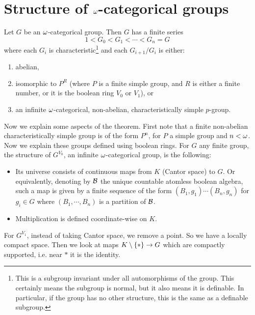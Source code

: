 \documentclass{amsart}
\begin{document}
\section{Structure of $\omega$-categorical groups}

\begin{thm}
Let $G$ be an $\omega$-categorical group. Then $G$ has a finite series 
\begin{equation}
1 < G_0 < G_1 < \cdots < G_n = G
\end{equation}
where each $G_i$ is characteristic\footnote{This is a subgroup invariant under all
automorphisms of the group. This certainly means the subgroup is normal, but it also means
it is definable. 
In particular, if the group has no other structure, this is the same as a definable subgroup.}
and each $G_{i+1} / G_i$ is either:
\begin{enumerate}[label = (\iii)]
\item abelian,
\item isomorphic to $P^R$ (where $P$ is a finite simple group, and $R$ is either a finite
number, or it is the boolean ring $V_0$ or $V_1$), or
\item an infinite $\omega$-categorical, non-abelian, characteristically simple $p$-group.
\end{enumerate}
\end{thm}

Now we explain some aspects of the theorem.
First note that a finite non-abelian characteristically simple group is of the form $P^n$,
for $P$ a simple group and $n < \omega$.
Now we explain these groups defined using boolean rings.
For $G$ any finite group, the structure of $G^{V_0}$, an infinite $\omega$-categorical group, is the following:
\begin{itemize}
\item Its universe consists of continuous maps from $K$ (Cantor space) to $G$.
Or equivalently, denoting by $\mathcal{B}$ the unique countable atomless boolean algebra, such a
map is given by a finite sequence of the form $\left( B_1 , g_1 \right) \cdots \left( B_n,
g_n\right)$ for $g_i\in G$ where $\left( B_1 , \cdots , B_n \right)$ is a partition of $\mathcal{B}$.
\item Multiplication is defined coordinate-wise on $K$.
\end{itemize}

For $G^{V_1}$, instead of taking Cantor space, we remove a point. 
So we have a locally compact space. 
Then we look at maps $K\setminus \left\{ * \right\}\rightarrow G$
which are compactly supported, i.e. near $*$ it is the identity.
\end{document}
